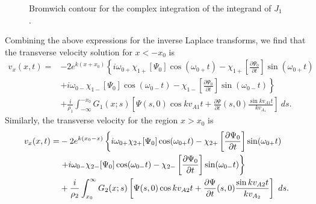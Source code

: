 \documentclass[12pt]{../style-files/ociamthesis}
\begin{document}
\begin{figure}
	\centering
	\caption{Bromwich contour for the complex integration of the integrand of $J_1$.}
	\label{fig: brom cont incomp 2}
\end{figure}
Combining the above expressions for the inverse Laplace transforms, we find that the transverse velocity solution for $x<-x_0$ is
\begin{align}
v_x(x, t) = &-2 e^{k(x+x_0)} \left\{ i\omega_{0+}\chi_{1+}[\Psi_0] \cos(\omega_{0+} t) - \chi_{1+}\left[ \frac{\partial \Psi_0}{\partial t} \right] \sin(\omega_{0+} t) \right. \\
&\left. + i\omega_{0-}\chi_{1-}[\Psi_0] \cos(\omega_{0-} t) - \chi_{1-}\left[ \frac{\partial \Psi_0}{\partial t} \right] \sin(\omega_{0-} t) \right\} \\
&+ \frac{i}{\rho_1} \int_{-\infty}^{-x_0} G_1(x;s) \left[ \Psi(s, 0) \cos{kv_{A1}t} + \frac{\partial \Psi}{\partial t}(s, 0) \frac{\sin{kv_{A1}t}}{kv_{A_1}} \right]~ds.
\end{align}
Similarly, the transverse velocity for the region $x>x_0$ is
\begin{align}
v_x(x, t) = &-2 e^{k(x_0 - x)} \left\{ i\omega_{0+}\chi_{2+}[\Psi_0] \cos(\omega_{0+} t) - \chi_{2+}\left[ \frac{\partial \Psi_0}{\partial t} \right] \sin(\omega_{0+} t) \right. \notag \\
&\left. + i\omega_{0-}\chi_{2-}[\Psi_0] \cos(\omega_{0-} t) - \chi_{2-}\left[ \frac{\partial \Psi_0}{\partial t} \right] \sin(\omega_{0-} t) \right\} \notag \\
& + \frac{i}{\rho_2} \int_{x_0}^{\infty} G_2(x;s) \left[ \Psi(s, 0) \cos{kv_{A2}t} + \frac{\partial \Psi}{\partial t}(s, 0) \frac{\sin{kv_{A2}t}}{kv_{A_2}} \right]~ds.
\end{align}
\end{document}
